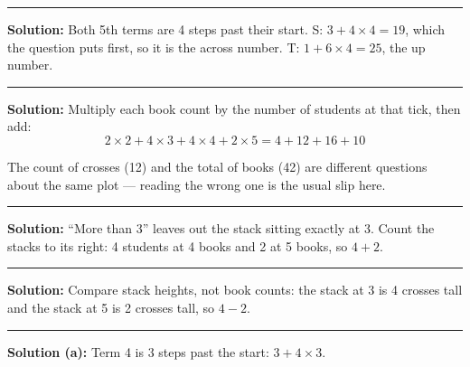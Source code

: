 \documentclass[12pt]{article}
\begin{document}
\vspace{0.15cm}\noindent\rule{\linewidth}{0.2pt}\vspace{0.15cm}


\textbf{Solution:} Both 5th terms are 4 steps past their start. S: $3 + 4 \times 4 = 19$, which the question puts first, so it is the across number. T: $1 + 6 \times 4 = 25$, the up number. 

\vspace{0.15cm}\noindent\rule{\linewidth}{0.2pt}\vspace{0.15cm}


\textbf{Solution:} Multiply each book count by the number of students at that tick, then add:
\[ 2 \times 2 + 4 \times 3 + 4 \times 4 + 2 \times 5 = 4 + 12 + 16 + 10 \]

The count of crosses (12) and the total of books (42) are different questions about the same plot --- reading the wrong one is the usual slip here.

\vspace{0.15cm}\noindent\rule{\linewidth}{0.2pt}\vspace{0.15cm}


\textbf{Solution:} ``More than 3'' leaves out the stack sitting exactly at 3. Count the stacks to its right: 4 students at 4 books and 2 at 5 books, so $4 + 2$. 

\vspace{0.15cm}\noindent\rule{\linewidth}{0.2pt}\vspace{0.15cm}


\textbf{Solution:} Compare stack heights, not book counts: the stack at 3 is 4 crosses tall and the stack at 5 is 2 crosses tall, so $4 - 2$. 

\vspace{0.15cm}\noindent\rule{\linewidth}{0.2pt}\vspace{0.15cm}


\textbf{Solution (a):} Term 4 is 3 steps past the start: $3 + 4 \times 3$. 
\end{document}
